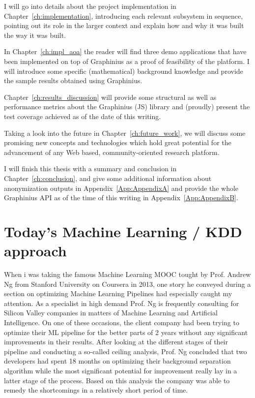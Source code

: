 I will go into details about the project implementation in Chapter~\ref{ch:implementation}, introducing each relevant subsystem in sequence, pointing out its role in the larger context and explain how and why it was built the way it was built.

In Chapter~\ref{ch:impl_aoa} the reader will find three demo applications that have been implemented on top of Graphinius as a proof of feasibility of the platform. I will introduce some specific (mathematical) background knowledge and provide the sample results obtained using Graphinius.

Chapter~\ref{ch:results_discussion} will provide some structural as well as performance metrics about the Graphinius (JS) library and (proudly) present the test coverage achieved as of the date of this writing.

Taking a look into the future in Chapter~\ref{ch:future_work}, we will discuss some promising new concepts and technologies which hold great potential for the advancement of any Web based, community-oriented research platform.

I will finish this thesis with a summary and conclusion in Chapter~\ref{ch:conclusion}, and give some additional information about anonymization outputs in Appendix~\ref{App:AppendixA} and provide the whole Graphinius API as of the time of this writing in Appendix~\ref{App:AppendixB}.


\section{Today's Machine Learning / KDD approach}
\label{sect:ml_kdd_today}

When i was taking the famous Machine Learning MOOC tought by Prof. Andrew Ng from Stanford University on Coursera in 2013, one story he conveyed during a section on optimizing Machine Learning Pipelines had especially caught my attention. As a specialist in high demand Prof. Ng is frequently consulting for Silicon Valley companies in matters of Machine Learning and Artificial Intelligence. On one of these occasions, the client company had been trying to optimize their ML pipeline for the better parts of 2 years without any significant improvements in their results. After looking at the different stages of their pipeline and conducting a so-called ceiling analysis, Prof. Ng concluded that two developers had spent 18 months on optimizing their background separation algorithm while the most significant potential for improvement really lay in a latter stage of the process. Based on this analysis the company was able to remedy the shortcomings in a relatively short period of time.

